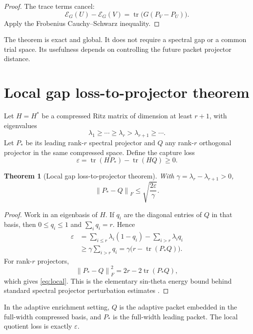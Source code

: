 \documentclass[11pt]{article}
\newtheorem{theorem}{Theorem}[section]
\theoremstyle{definition}
\theoremstyle{remark}
\newcommand{\norm}[1]{\left\lVert#1\right\rVert}
\newcommand{\tr}{\operatorname{tr}}
\newcommand{\E}{\mathcal E}
\begin{document}
\begin{proof}
The trace terms cancel:
\[
 \E_G(U)-\E_G(V)=\tr\bigl(G(P_V-P_U)\bigr).
\]
Apply the Frobenius Cauchy--Schwarz inequality.
\end{proof}

The theorem is exact and global.  It does not require a spectral gap or a
common trial space.  Its usefulness depends on controlling the future packet
projector distance.

\section{Local gap loss-to-projector theorem}
\label{sec:local}

Let $H=H^*$ be a compressed Ritz matrix of dimension at least $r+1$, with
eigenvalues
\[
 \lambda_1\ge\cdots\ge\lambda_r>
 \lambda_{r+1}\ge\cdots.
\]
Let $P_*$ be its leading rank-$r$ spectral projector and $Q$ any rank-$r$
orthogonal projector in the same compressed space.  Define the capture loss
\[
 \varepsilon=\tr(HP_*)-\tr(HQ)\ge0.
\]

\begin{theorem}[Local gap loss-to-projector theorem]
\label{thm:local}
With $\gamma=\lambda_r-\lambda_{r+1}>0$,
\begin{equation}
 \norm{P_*-Q}_F
 \le\sqrt{\frac{2\varepsilon}{\gamma}}.
 \label{eq:local}
\end{equation}
\end{theorem}

\begin{proof}
Work in an eigenbasis of $H$.  If $q_i$ are the diagonal entries of $Q$ in
that basis, then $0\le q_i\le1$ and $\sum_iq_i=r$.  Hence
\begin{align*}
 \varepsilon
 &=\sum_{i\le r}\lambda_i(1-q_i)
   -\sum_{i>r}\lambda_iq_i\\
 &\ge\gamma\sum_{i>r}q_i
 =\gamma\bigl(r-\tr(P_*Q)\bigr).
\end{align*}
For rank-$r$ projectors,
\[
 \norm{P_*-Q}_F^2=2r-2\tr(P_*Q),
\]
which gives \eqref{eq:local}.  This is the elementary sin-theta energy bound
behind standard spectral projector perturbation estimates
\citep{DavisKahan1970,StewartSun1990}.
\end{proof}

In the adaptive enrichment setting, $Q$ is the adaptive packet embedded in
the full-width compressed basis, and $P_*$ is the full-width leading packet.
The local quotient loss is exactly $\varepsilon$.
\end{document}
